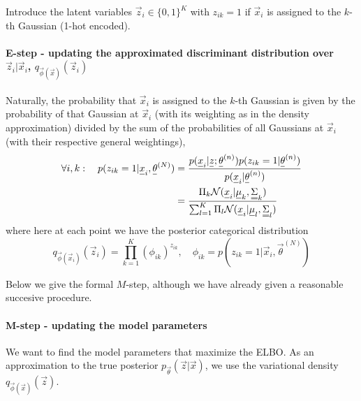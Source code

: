 
Introduce the latent variables $\vec{z}_i \in \{0,1\}^K$ with $z_{ik} = 1$ if $\vec{x}_i$ is assigned to the $k$-th Gaussian
(1-hot encoded).

\paragraph*{E-step - updating the approximated discriminant distribution over $\vec{z}_i | \vec{x}_i$, $q_{\vec{\phi}(\vec{x})}(\vec{z}_i)$} Naturally, the probability that $\vec{x}_i$ is assigned to the $k$-th Gaussian is given by
the probability of that Gaussian at $\vec{x}_i$ (with its weighting as in the density approximation) divided by the sum of the probabilities of all Gaussians at $\vec{x}_i$ (with their respective
general weightings),
\begin{equation}
    \begin{aligned}
        \forall i,k: \quad p(z_{ik} = 1 | \vec{x}_i, \vec{\theta}^{(N)}) &= \frac{p(\vec{x}_i|\vec{z};\vec{\theta}^{(n)}) p(z_{ik} = 1 | \vec{\theta}^{(n)})}{p(\vec{x}_i | \vec{\theta}^{(n)})} \\
        &= \frac{\Pi_k \mathcal{N}(\vec{x}_i | \vec{\mu}_k, \mat{\Sigma}_k)}{\sum_{l=1}^{K} \Pi_l \mathcal{N}(\vec{x}_i | \vec{\mu}_l, \mat{\Sigma}_l)}
    \end{aligned}
\end{equation}
where here at each point we have the posterior categorical distribution
\begin{equation}
    q_{\vec{\phi}(\vec{x}_i)}(\vec{z}_i) = \prod_{k=1}^{K} \left( \phi_{ik} \right)^{z_{ik}}, \quad \phi_{ik} = p\left(z_{ik} = 1 | \vec{x}_i, \vec{\theta}^{(N)}\right)
\end{equation}


Below we give the formal $M$-step, although we have already given a reasonable succesive procedure.

\paragraph*{M-step - updating the model parameters} We want to find the model parameters that maximize the ELBO. As an approximation
to the true posterior $p_{\vec{\theta}}(\vec{z} | \vec{x})$, we use the variational density $q_{\vec{\phi}(\vec{x})}(\vec{z})$.


